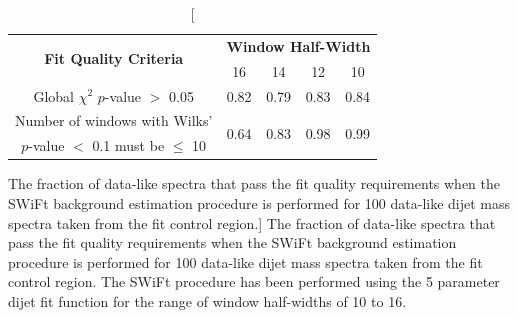 {\renewcommand{\arraystretch}{1.3}
\begin{table}[!htb]
\centering
\begin{tabular}{|c||c|c|c|c|}
\hline
 \multirow{2}{*}{\textbf{Fit Quality Criteria}} & \multicolumn{4}{c|}{\textbf{Window Half-Width}} \\ \cline{2-5} 
                                                & 16 & 14 & 12 & 10 \\ \hline
\multirow{2}{*}{Global $\chi^2$ $p$-value $>$ 0.05} & \multirow{2}{*}{0.82} & \multirow{2}{*}{0.79} & \multirow{2}{*}{0.83} & \multirow{2}{*}{0.84} \\
 &  &  &  &  \\ \hline
Number of windows with Wilks' & \multirow{2}{*}{0.64} & \multirow{2}{*}{0.83} & \multirow{2}{*}{0.98} & \multirow{2}{*}{0.99} \\
\mbox{$p$-value} $<$ 0.1 must be $\leq$ 10 &  &  &  &  \\ \hline
\end{tabular}
\caption
    [The fraction of data-like spectra that pass the fit quality requirements when the SWiFt background estimation procedure is performed for
      100 data-like dijet mass spectra taken from the \lm{} fit control region.]
    {The fraction of data-like spectra that pass the fit quality requirements when the SWiFt background estimation procedure is performed for
      100 data-like dijet mass spectra taken from the \lm{} fit control region.
      The SWiFt procedure has been performed using the 5 parameter dijet fit function
      for the range of window half-widths of 10 to 16.}
\label{tab:windowSel_dataLike}
\end{table}
\vspace{-1em}
}

%


